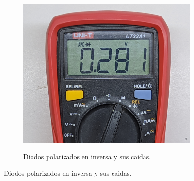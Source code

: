 \documentclass[chaptersright]{informeutn}
\begin{document}
\begin{figure}[!ht]
\begin{subfigure}[b]{1\textwidth}
\begin{minipage}[b]{0.24\textwidth}
          \includegraphics[width=1\textwidth]{pictures/mult_diod-4d.jpg}
        \end{minipage}
      \end{subfigure}
      \begin{subfigure}[b]{1\textwidth}
        \centering
        \caption{Diodos polarizados en inversa y sus caidas.}
        \begin{minipage}[b]{0.24\textwidth}
          \centering

\end{minipage}
\end{subfigure}
\end{figure}
\end{document}
